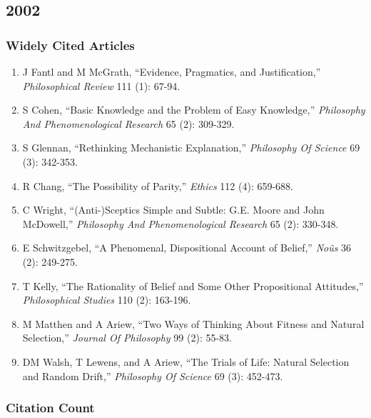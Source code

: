 \documentclass[
  10pt,
  letterpaper,
  DIV=11,
  numbers=noendperiod,
  twoside]{scrartcl}
\providecommand{\tightlist}{%
  \setlength{\itemsep}{0pt}\setlength{\parskip}{0pt}}\usepackage{longtable,booktabs,array}
\begin{document}
\newpage

\subsection{2002}\label{sec-s2002}

\subsubsection*{Widely Cited Articles}\label{widely-cited-articles-26}

\begin{enumerate}
\def\labelenumi{\arabic{enumi}.}
\tightlist
\item
  J Fantl and M McGrath, ``Evidence, Pragmatics, and Justification,''
  \emph{Philosophical Review} 111 (1): 67-94.
\item
  S Cohen, ``Basic Knowledge and the Problem of Easy Knowledge,''
  \emph{Philosophy And Phenomenological Research} 65 (2): 309-329.
\item
  S Glennan, ``Rethinking Mechanistic Explanation,'' \emph{Philosophy Of
  Science} 69 (3): 342-353.
\item
  R Chang, ``The Possibility of Parity,'' \emph{Ethics} 112 (4):
  659-688.
\item
  C Wright, ``(Anti-)Sceptics Simple and Subtle: G.E. Moore and John
  McDowell,'' \emph{Philosophy And Phenomenological Research} 65 (2):
  330-348.
\item
  E Schwitzgebel, ``A Phenomenal, Dispositional Account of Belief,''
  \emph{Noûs} 36 (2): 249-275.
\item
  T Kelly, ``The Rationality of Belief and Some Other Propositional
  Attitudes,'' \emph{Philosophical Studies} 110 (2): 163-196.
\item
  M Matthen and A Ariew, ``Two Ways of Thinking About Fitness and
  Natural Selection,'' \emph{Journal Of Philosophy} 99 (2): 55-83.
\item
  DM Walsh, T Lewens, and A Ariew, ``The Trials of Life: Natural
  Selection and Random Drift,'' \emph{Philosophy Of Science} 69 (3):
  452-473.
\end{enumerate}

\subsubsection*{Citation Count}\label{sec-count-2002}
\end{document}
